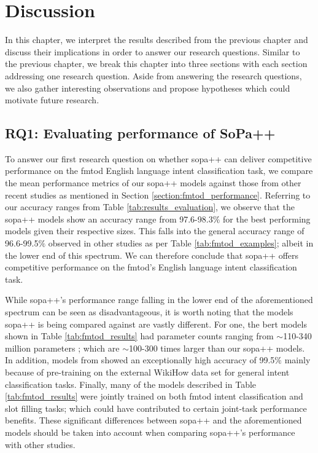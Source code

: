 \chapter{Discussion}

\label{chapter:discussion}

In this chapter, we interpret the results described from the previous chapter
and discuss their implications in order to answer our research questions.
Similar to the previous chapter, we break this chapter into three sections with
each section addressing one research question. Aside from answering the research
questions, we also gather interesting observations and propose hypotheses which could
motivate future research.

\section{RQ1: Evaluating performance of SoPa++}

To answer our first research question on whether \ac{sopa}++ can deliver competitive
performance on the \ac{fmtod} English language intent classification task, we compare
the mean performance metrics of our \ac{sopa}++ models against those from other
recent studies as mentioned in Section \ref{section:fmtod_performance}.
Referring to our accuracy ranges from Table \ref{tab:results_evaluation}, we
observe that the \ac{sopa}++ models show an accuracy range from 97.6-98.3$\%$ for the
best performing models given their respective sizes. This falls into the general
accuracy range of 96.6-99.5$\%$ observed in other studies as per Table
\ref{tab:fmtod_examples}; albeit in the lower end of this spectrum. We can
therefore conclude that \ac{sopa}++ offers competitive performance on the \ac{fmtod}'s
English language intent classification task.

While \ac{sopa}++'s performance range falling in the lower end of the aforementioned
spectrum can be seen as disadvantageous, it is worth noting that the models
\ac{sopa}++ is being compared against are vastly different. For one, the \ac{bert}
models shown in Table \ref{tab:fmtod_results} had parameter counts ranging from
$\sim$110-340 million parameters \citep{devlin-etal-2019-bert}; which are
$\sim$100-300 times larger than our \ac{sopa}++ models. In addition, models from
\citet{zhang-etal-2020-intent} showed an exceptionally high accuracy of 99.5$\%$
mainly because of pre-training on the external WikiHow data set for general
intent classification tasks. Finally, many of the models described in Table
\ref{tab:fmtod_results} were jointly trained on both \ac{fmtod} intent classification
and slot filling tasks; which could have contributed to certain joint-task
performance benefits. These significant differences between \ac{sopa}++ and the
aforementioned models should be taken into account when comparing \ac{sopa}++'s
performance with other studies. 

